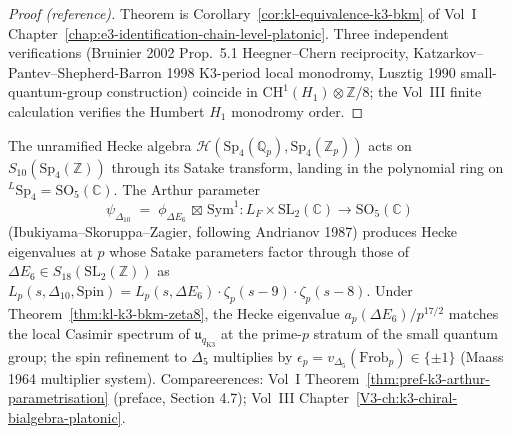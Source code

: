 \begin{proof}[Proof (reference)]
Theorem is Corollary~\ref{cor:kl-equivalence-k3-bkm} of Vol~I
Chapter~\ref{chap:e3-identification-chain-level-platonic}. Three
independent verifications (Bruinier 2002 Prop.~5.1 Heegner--Chern
reciprocity, Katzarkov--Pantev--Shepherd-Barron 1998 K3-period local
monodromy, Lusztig 1990 small-quantum-group construction) coincide in
$\mathrm{CH}^1(H_1)\otimes \mathbb{Z}/8$; the Vol~III finite
calculation verifies the Humbert $H_1$ monodromy order.
\end{proof}

\begin{remark}
\label{rem:hecke-action-arthur-ym}
The unramified Hecke algebra $\mathcal{H}(\mathrm{Sp}_4(\mathbb{Q}_p),
\mathrm{Sp}_4(\mathbb{Z}_p))$ acts on $S_{10}(\mathrm{Sp}_4
(\mathbb{Z}))$ through its Satake transform, landing in the polynomial
ring on ${}^L\mathrm{Sp}_4 = \mathrm{SO}_5(\mathbb{C})$. The Arthur
parameter
\[
 \psi_{\Delta_{10}}
 \;=\;
 \phi_{\Delta E_6}\,\boxtimes\,\mathrm{Sym}^1
 \colon
 L_F \times \mathrm{SL}_2(\mathbb{C})
 \longrightarrow
 \mathrm{SO}_5(\mathbb{C})
\]
(Ibukiyama--Skoruppa--Zagier, following Andrianov 1987) produces
Hecke eigenvalues at $p$ whose Satake parameters factor through those
of $\Delta E_6\in S_{18}(\mathrm{SL}_2(\mathbb{Z}))$ as
$L_p(s, \Delta_{10}, \mathrm{Spin}) = L_p(s, \Delta E_6)\cdot
\zeta_p(s-9)\cdot \zeta_p(s-8)$. Under
Theorem~\ref{thm:kl-k3-bkm-zeta8}, the Hecke eigenvalue $a_p(\Delta
E_6)/p^{17/2}$ matches the local Casimir spectrum of
$\mathfrak{u}_{q_{\mathrm{K3}}}$ at the prime-$p$ stratum of the small
quantum group; the spin refinement to $\Delta_5$ multiplies by
$\epsilon_p = v_{\Delta_5}(\mathrm{Frob}_p) \in \{\pm 1\}$ (Maass
1964 multiplier system). Compareerences: Vol~I
Theorem~\ref{thm:pref-k3-arthur-parametrisation} (preface, Section 4.7);
Vol~III Chapter~\ref{V3-ch:k3-chiral-bialgebra-platonic}.
\end{remark}

